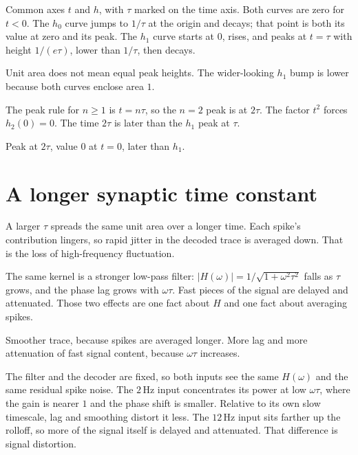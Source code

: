 \documentclass[11pt,letterpaper]{article}
\newcommand{\ans}[1]{\par\vspace{2pt}{\bfseries #1}\quad}
\begin{document}
\ans{1.}
\begin{sketch}
Common axes $t$ and $h$, with $\tau$ marked on the time axis. Both curves are zero for $t < 0$. The $h_0$ curve jumps to $1/\tau$ at the origin and decays; that point is both its value at zero and its peak. The $h_1$ curve starts at $0$, rises, and peaks at $t = \tau$ with height $1/(e\tau)$, lower than $1/\tau$, then decays.
\end{sketch}
Unit area does not mean equal peak heights. The wider-looking $h_1$ bump is lower because both curves enclose area $1$.

\ans{2.}
The peak rule for $n \ge 1$ is $t = n\tau$, so the $n = 2$ peak is at $2\tau$. The factor $t^2$ forces $h_2(0) = 0$. The time $2\tau$ is later than the $h_1$ peak at $\tau$.
\begin{result}
Peak at $2\tau$, value $0$ at $t = 0$, later than $h_1$.
\end{result}

\section{A longer synaptic time constant}

\ans{1.}
A larger $\tau$ spreads the same unit area over a longer time. Each spike's contribution lingers, so rapid jitter in the decoded trace is averaged down. That is the loss of high-frequency fluctuation.

The same kernel is a stronger low-pass filter: $|H(\omega)| = 1/\sqrt{1 + \omega^2\tau^2}$ falls as $\tau$ grows, and the phase lag grows with $\omega\tau$. Fast pieces of the signal are delayed and attenuated. Those two effects are one fact about $H$ and one fact about averaging spikes.
\begin{result}
Smoother trace, because spikes are averaged longer. More lag and more attenuation of fast signal content, because $\omega\tau$ increases.
\end{result}

\ans{2.}
The filter and the decoder are fixed, so both inputs see the same $H(\omega)$ and the same residual spike noise. The $2\,\mathrm{Hz}$ input concentrates its power at low $\omega\tau$, where the gain is nearer $1$ and the phase shift is smaller. Relative to its own slow timescale, lag and smoothing distort it less. The $12\,\mathrm{Hz}$ input sits farther up the rolloff, so more of the signal itself is delayed and attenuated. That difference is signal distortion.
\end{document}

